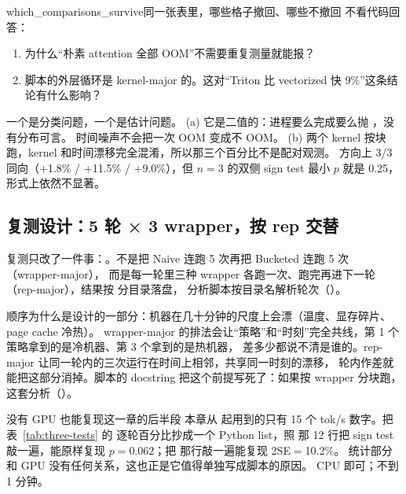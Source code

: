 \begin{checkpoint}{which_comparisons_survive}{同一张表里，哪些格子撤回、哪些不撤回}
不看代码回答：
\begin{enumerate}[label=(\alph*)]
  \item 为什么“朴素 attention 全部 OOM”不需要重复测量就能报？
  \item 脚本的外层循环是 kernel-major 的。这对“Triton 比 vectorized 快 9\%”这条结论有什么影响？
\end{enumerate}
\hint 一个是分类问题，一个是估计问题。
\ifshowanswers
\tcblower
\answer (a) 它是二值的：进程要么完成要么抛 ，没有分布可言。
时间噪声不会把一次 OOM 变成不 OOM。
(b) 两个 kernel 按块跑，kernel 和时间漂移完全混淆，所以那三个百分比不是配对观测。
方向上 3/3 同向（+1.8\% / +11.5\% / +9.0\%），但 $n=3$ 的双侧 sign test 最小 $p$ 就是 0.25，
形式上依然不显著。
\whereincode {}
\fi
\end{checkpoint}

\subsection{复测设计：5 轮 × 3 wrapper，按 rep 交替}
\label{subsec:replication-design}

复测只改了一件事：。不是把 Naive 连跑 5 次再把 Bucketed 连跑 5 次（wrapper-major），
而是每一轮里三种 wrapper 各跑一次、跑完再进下一轮（rep-major），结果按  分目录落盘，
分析脚本按目录名解析轮次（）。

顺序为什么是设计的一部分：机器在几十分钟的尺度上会漂（温度、显存碎片、page cache 冷热）。
wrapper-major 的排法会让“策略”和“时刻”完全共线，第 1 个策略拿到的是冷机器、第 3 个拿到的是热机器，
差多少都说不清是谁的。rep-major 让同一轮内的三次运行在时间上相邻，共享同一时刻的漂移，
轮内作差就能把这部分消掉。脚本的 docstring 把这个前提写死了：如果按 wrapper 分块跑，
这套分析（）。

\begin{tipbox}{没有 GPU 也能复现这一章的后半段}
本章从  起用到的只有 15 个 tok/s 数字。把表~\ref{tab:three-tests} 的
逐轮百分比抄成一个 Python list，照 
那 12 行把 sign test 敲一遍，能原样复现 $p=0.062$；把  那行敲一遍能复现 2SE$=$10.2\%。
统计部分和 GPU 没有任何关系，这也正是它值得单独写成脚本的原因。
\resources CPU 即可；不到 1 分钟。
\end{tipbox}

